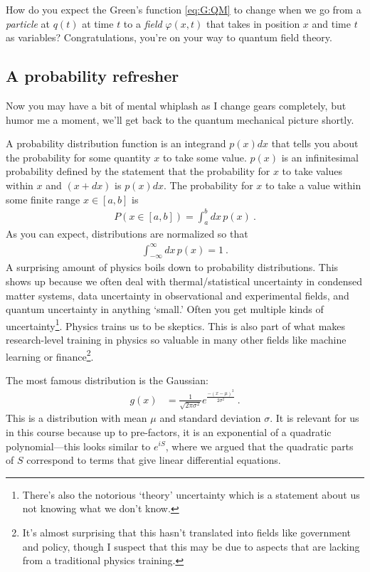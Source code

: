 \begin{exercise}
How do you expect the Green's function \eqref{eq:G:QM} to change when we go from a \emph{particle} at $q(t)$ at time $t$ to a \emph{field} $\varphi(x,t)$ that takes in position $x$ and time $t$ as variables?  Congratulations, you're on your way to quantum field theory. 
\end{exercise}

\subsection{A probability refresher}

Now you may have a bit of mental whiplash as I change gears completely, but humor me a moment, we'll get back to the quantum mechanical picture shortly. 

A probability distribution function is an integrand $p(x)dx$ that tells you about the probability for some quantity $x$ to take some value. $p(x)$ is an infinitesimal probability defined by the statement that the probability for $x$ to take values within $x$ and $(x+dx)$ is $p(x)dx$. The probability for $x$ to take a value within some finite range $x\in[a,b]$ is
\begin{align}
	P(x\in[a,b]) = \int_a^b dx\, p(x) \ .
\end{align}
As you can expect, distributions are normalized so that
\begin{align}
	\int_{-\infty}^{\infty} dx\, p(x) = 1 \ .
\end{align}
A surprising amount of physics boils down to probability distributions. This shows up because we often deal with thermal/statistical uncertainty in condensed matter systems, data uncertainty in observational and experimental fields, and quantum uncertainty in anything `small.' Often you get multiple kinds of uncertainty\footnote{There's also the notorious `theory' uncertainty which is a statement about us not knowing what we don't know.}. Physics trains us to be skeptics. This is also part of what makes research-level training in physics so valuable in many other fields like machine learning or finance\footnote{It's almost surprising that this hasn't translated into fields like government and policy, though I suspect that this may be due to aspects that are lacking from a traditional physics training.}.

\begin{example}
The most famous distribution is the Gaussian:
\begin{align}
	g(x) &= \frac{1}{\sqrt{2\pi \sigma^2}} e^{\frac{-(x-\mu)^2}{2\sigma^2}} \ .
\end{align}
This is a distribution with mean $\mu$ and standard deviation $\sigma$. It is relevant for us in this course because up to pre-factors, it is an exponential of a quadratic polynomial---this looks similar to $e^{iS}$, where we argued that the quadratic parts of $S$ correspond to terms that give linear differential equations.
\end{example}

